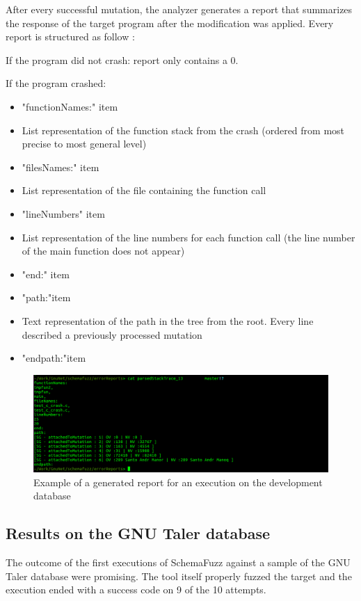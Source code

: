 \documentclass{article}
\begin{document}
\begin{empfile}
After every successful mutation, the analyzer generates a report that summarizes the response of the target program after the modification was applied.
Every report is structured as follow :

If the program did not crash: report only contains a 0.
	

If the program crashed:
		\begin{itemize}
		\item{"functionNames:" item}
		\item{List representation of the function stack from the crash (ordered from most precise to most general level) }
		\item{"filesNames:" item}
		\item{List representation of the file containing the function call}
		\item{"lineNumbers" item}
		\item{List representation of the line numbers for each function call (the line number of the main function does not appear)}
		\item{"end:" item}
		\item{"path:"item}
		\item{Text representation of the path in the tree from the root. Every line described a previously processed mutation}
		\item{"endpath:"item}
		\end{itemize}
	
		\bigskip
		\begin{figure} [h!]
			\includegraphics[width=\textwidth]{sc1.png}
			\caption{Example of a generated report for an execution on the development database }
		\end{figure}
		\bigskip
		
		\subsection{Results on the GNU Taler database}

The outcome of the first executions of SchemaFuzz against a sample of the GNU Taler database were promising. The tool itself properly fuzzed the target and the execution ended with a success
code on 9 of the 10 attempts.


\end{empfile}
\end{document}
